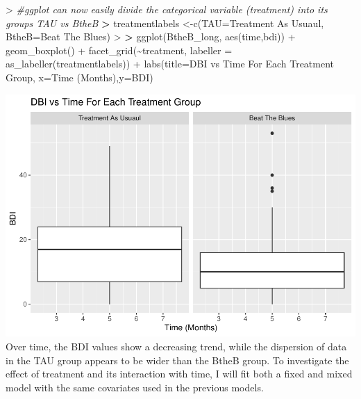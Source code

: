 \documentclass[
]{article}
\newenvironment{Shaded}{\begin{snugshade}}{\end{snugshade}}
\newcommand{\AttributeTok}[1]{\textcolor[rgb]{0.77,0.63,0.00}{#1}}
\newcommand{\CommentTok}[1]{\textcolor[rgb]{0.56,0.35,0.01}{\textit{#1}}}
\newcommand{\ErrorTok}[1]{\textcolor[rgb]{0.64,0.00,0.00}{\textbf{#1}}}
\newcommand{\FunctionTok}[1]{\textcolor[rgb]{0.00,0.00,0.00}{#1}}
\newcommand{\NormalTok}[1]{#1}
\newcommand{\OtherTok}[1]{\textcolor[rgb]{0.56,0.35,0.01}{#1}}
\newcommand{\SpecialCharTok}[1]{\textcolor[rgb]{0.00,0.00,0.00}{#1}}
\newcommand{\StringTok}[1]{\textcolor[rgb]{0.31,0.60,0.02}{#1}}
\begin{document}
\begin{Shaded}
\begin{Highlighting}[]
\SpecialCharTok{\textgreater{}} \CommentTok{\#ggplot can now easily divide the categorical variable (treatment) into its groups TAU vs BtheB}
\ErrorTok{\textgreater{}}\NormalTok{ treatmentlabels }\OtherTok{\textless{}{-}}\FunctionTok{c}\NormalTok{(}\StringTok{\textquotesingle{}TAU\textquotesingle{}}\OtherTok{=}\StringTok{\textquotesingle{}Treatment As Usuaul\textquotesingle{}}\NormalTok{, }\StringTok{\textquotesingle{}BtheB\textquotesingle{}}\OtherTok{=}\StringTok{\textquotesingle{}Beat The Blues\textquotesingle{}}\NormalTok{)}
\SpecialCharTok{\textgreater{}} 
\ErrorTok{\textgreater{}} \FunctionTok{ggplot}\NormalTok{(BtheB\_long, }\FunctionTok{aes}\NormalTok{(time,bdi)) }\SpecialCharTok{+} \FunctionTok{geom\_boxplot}\NormalTok{() }\SpecialCharTok{+} \FunctionTok{facet\_grid}\NormalTok{(}\SpecialCharTok{\textasciitilde{}}\NormalTok{treatment, }\AttributeTok{labeller =} \FunctionTok{as\_labeller}\NormalTok{(treatmentlabels)) }\SpecialCharTok{+} \FunctionTok{labs}\NormalTok{(}\AttributeTok{title=}\StringTok{\textquotesingle{}DBI vs Time For Each Treatment Group\textquotesingle{}}\NormalTok{, }\AttributeTok{x=}\StringTok{\textquotesingle{}Time (Months)\textquotesingle{}}\NormalTok{,}\AttributeTok{y=}\StringTok{\textquotesingle{}BDI\textquotesingle{}}\NormalTok{)}
\end{Highlighting}
\end{Shaded}

\includegraphics{HUDM6122-Homework_10-Chenguang-Pan_files/figure-latex/unnamed-chunk-11-1.pdf}
Over time, the BDI values show a decreasing trend, while the dispersion
of data in the TAU group appears to be wider than the BtheB group. To
investigate the effect of treatment and its interaction with time, I
will fit both a fixed and mixed model with the same covariates used in
the previous models.
\end{document}
